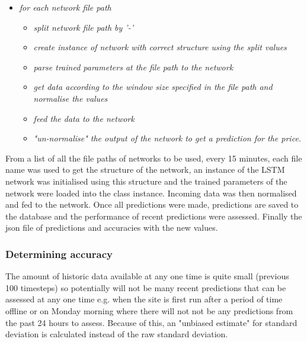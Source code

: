             \begin{itemize}
                \item \textit{for each network file path}
                    \begin{itemize}
                        \item \textit{split network file path by '-'}
                        \item \textit{create instance of network with correct structure using the split values}
                        \item \textit{parse trained parameters at the file path to the network }
                        \item \textit{get data according to the window size specified in the file path and normalise the values}
                        \item \textit{feed the data to the network}
                        \item \textit{"un-normalise" the output of the network to get a prediction for the price.}
                    \end{itemize}
            \end{itemize}
            
        
            From a list of all the file paths of networks to be used, every 15 minutes, each file name was used to get the structure of the network, an instance of the LSTM network was initialised using this structure and the trained parameters of the network were loaded into the class instance. Incoming data was then normalised and fed to the network. Once all predictions were made, predictions are saved to the database and the performance of recent predictions were assessed. Finally the json file of predictions and accuracies with the new values.


            \subsubsection{Determining accuracy}
            
            The amount of historic data available at any one time is quite small (previous 100 timesteps) so potentially will not be many recent predictions that can be assessed at any one time e.g. when the site is first run after a period of time offline or on Monday morning where there will not not be any predictions from the past 24 hours to assess. Because of this, an "unbiased estimate" for standard deviation is calculated instead of the raw standard deviation.

